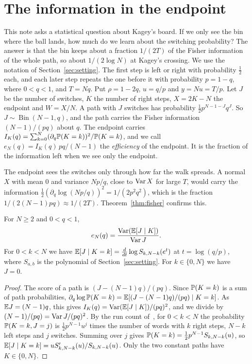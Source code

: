 \section{The information in the endpoint}\label{sec:fisher}

This note asks a statistical question about Kagey's board. If we only see the
bin where the ball lands, how much do we learn
about the switching probability? The answer is that the bin keeps about a
fraction $1/(2T)$ of the Fisher information of the whole path, so about
$1/(2\log N)$ at Kagey's crossing. We use the notation of
Section~\ref{sec:setting}. The first step is left or right with probability
$\frac12$ each, and each later step repeats the one before it with probability
$p=1-q$, where $0<q<1$, and $T=Nq$.
Put $\rho=1-2q$, $u=q/p$ and $y=Nu=T/p$. Let $J$ be the number of
switches, $K$ the number of right steps, $X=2K-N$ the endpoint and $W=X/N$. A path with $J$ switches has probability
$\frac12p^{N-1-J}q^J$. So $J\sim\operatorname{Bin}(N-1,q)$, and the path
carries the Fisher information $(N-1)/(pq)$ about $q$. The endpoint carries
$I_K(q)=\sum_{k=0}^N(\partial_q\mathbb P(K=k))^2/\mathbb P(K=k)$, and we call
$e_N(q)=I_K(q)\,pq/(N-1)$ the \emph{efficiency} of the endpoint. It is the
fraction of the information left when we see only the endpoint.

The endpoint sees the switches only through how far the walk spreads. A
normal $X$ with mean $0$ and variance $Np/q$, close to $\operatorname{Var} X$ for large
$T$, would carry the information $\frac12(\partial_q\log(Np/q))^2=1/(2p^2q^2)$,
which is the fraction $1/(2(N-1)pq)\approx1/(2T)$. Theorem~\ref{thm:fisher}
confirms this.

\begin{proposition}\label{prop:eta}
For $N\ge2$ and $0<q<1$,
\[
 e_N(q)=\frac{\operatorname{Var}(\mathbb E[J\mid K])}{\operatorname{Var} J}.
\]
For $0<k<N$ we have $\mathbb E[J\mid K=k]=\frac{d}{dt}\log S_{k,N-k}(e^t)$ at
$t=\log(q/p)$, where $S_{a,b}$ is the polynomial of
Section~\ref{sec:setting}. For $k\in\{0,N\}$ we have $J=0$.
\end{proposition}

\begin{proof}
The score of a path is $(J-(N-1)q)/(pq)$. Since $\mathbb P(K=k)$ is a sum of path
probabilities, $\partial_q\log\mathbb P(K=k)=\mathbb E[(J-(N-1)q)/(pq)\mid K=k]$. As
$\mathbb E J=(N-1)q$, this gives $I_K(q)=\operatorname{Var}(\mathbb E[J\mid K])/(pq)^2$, and we divide by
$(N-1)/(pq)=\operatorname{Var} J/(pq)^2$. By the run count of~\cite{paperA}, for $0<k<N$
the probability $\mathbb P(K=k,J=j)$ is $\frac12p^{N-1}u^j$ times the number of
words with $k$ right steps, $N-k$ left steps and $j$ switches. Summing over
$j$ gives $\mathbb P(K=k)=\frac12p^{N-1}S_{k,N-k}(u)$, so
$\mathbb E[J\mid K=k]=uS'_{k,N-k}(u)/S_{k,N-k}(u)$. Only the two constant paths have
$K\in\{0,N\}$.
\end{proof}

